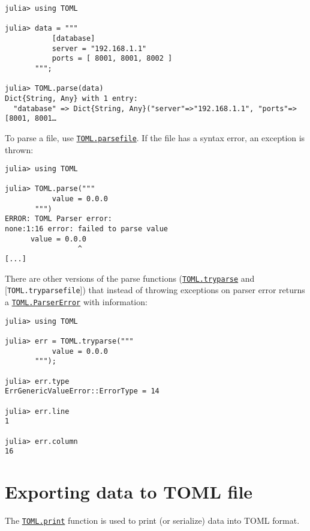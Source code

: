 \begin{verbatim}
julia> using TOML

julia> data = """
           [database]
           server = "192.168.1.1"
           ports = [ 8001, 8001, 8002 ]
       """;

julia> TOML.parse(data)
Dict{String, Any} with 1 entry:
  "database" => Dict{String, Any}("server"=>"192.168.1.1", "ports"=>[8001, 8001…
\end{verbatim}



To parse a file, use \hyperlink{7810654945362887951}{\texttt{TOML.parsefile}}. If the file has a syntax error, an exception is thrown:




\begin{verbatim}
julia> using TOML

julia> TOML.parse("""
           value = 0.0.0
       """)
ERROR: TOML Parser error:
none:1:16 error: failed to parse value
      value = 0.0.0
                 ^
[...]
\end{verbatim}



There are other versions of the parse functions (\hyperlink{16126470487745448226}{\texttt{TOML.tryparse}} and [\texttt{TOML.tryparsefile}]) that instead of throwing exceptions on parser error returns a \hyperlink{704017640374729671}{\texttt{TOML.ParserError}} with information:




\begin{verbatim}
julia> using TOML

julia> err = TOML.tryparse("""
           value = 0.0.0
       """);

julia> err.type
ErrGenericValueError::ErrorType = 14

julia> err.line
1

julia> err.column
16
\end{verbatim}



\hypertarget{17709882950916030924}{}


\section{Exporting data to TOML file}



The \hyperlink{14229671440710768222}{\texttt{TOML.print}} function is used to print (or serialize) data into TOML format.




